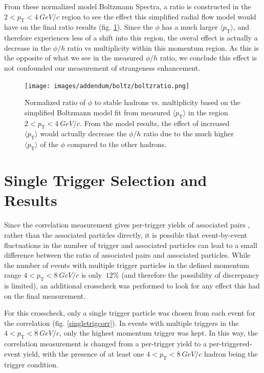 \documentclass[ALICE,manyauthors]{ALICE_analysis_notes}
\begin{document}
\begin{itemize}
From these normalized model Boltzmann Spectra, a ratio is constructed in the $2 < p_{\text{T}} < \SI{4}{GeV/c}$ region to see the effect this simplified radial flow model would have on the final ratio results (fig. \ref{boltzratio}).  Since the $\phi$ has a much larger $\langle p_{\text{T}} \rangle$, and therefore experiences less of a shift into this region, the overal effect is actually a decrease in the $\phi/h$ ratio vs multiplicity within this momentum region. As this is the opposite of what we see in the measured $\phi/h$ ratio, we conclude this effect is not confounded our measurement of strangeness enhancement.

\begin{figure}[ht]
\centering
\texttt{[image: images/addendum/boltz/boltzratio.png]}
\caption{Normalized ratio of $\phi$ to stable hadrons vs. multiplicity based on the simplified Boltzmann model fit from measured $\langle p_{\text{T}} \rangle$ in the region $2 < p_{\text{T}} < \SI{4}{GeV/c}$.  From the model results, the effect of increased $\langle p_{\text{T}} \rangle$ would actually decrease the $\phi/h$ ratio due to the much higher $\langle p_{\text{T}} \rangle$ of the $\phi$ compared to the other hadrons.}
\label{boltzratio}
\end{figure}

\section{Single Trigger Selection and Results}

Since the correlation measurement gives per-trigger yields of associated pairs , rather than the associated particles directly, it is possible that event-by-event fluctuations in the number of trigger and associated particles can lead to a small difference between the ratio of associated pairs and associated particles. While the number of events with multiple trigger particles in the defined momentum range $4 < p_{\text{T}} < \SI{8}{GeV/c}$ is only $~12\%$ (and therefore the possibility of discrepancy is limited), an additional crosscheck was performed to look for any effect this had on the final measurement.

For this crosscheck, only a single trigger particle was chosen from each event for the correlation (fig. \ref{singletrigcorr}).  In events with multiple triggers in the $4 < p_{\text{T}} < \SI{8}{GeV/c}$, only the highest momentum trigger was kept.  In this way, the correlation measurement is changed from a per-trigger yield to a per-triggered-event yield, with the presence of at least one $4 < p_{\text{T}} < \SI{8}{GeV/c}$ hadron being the trigger condition.


\end{itemize}
\end{document}
